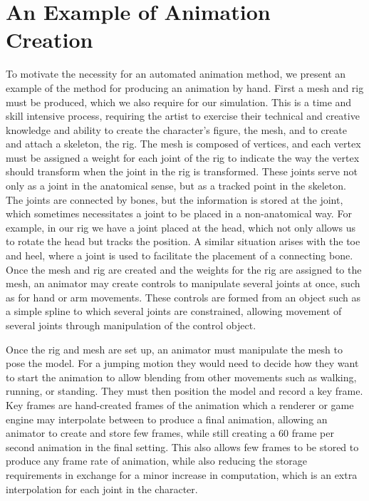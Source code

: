 
 
\section{An Example of Animation Creation}
\label{section:anim_ex}
To motivate the necessity for an automated animation method, we present an example of the method for producing an animation by hand.  First a mesh and rig must be produced, which we also require for our simulation.  This is a time and skill intensive process, requiring the artist to exercise their technical and creative knowledge and ability to create the character's figure, the mesh, and to create and attach a skeleton, the rig.  The mesh is composed of vertices, and each vertex must be assigned a weight for each joint of the rig to indicate the way the vertex should transform when the joint in the rig is transformed.  These joints serve not only as a joint in the anatomical sense, but as a tracked point in the skeleton.  The joints are connected by bones, but the information is stored at the joint, which sometimes necessitates a joint to be placed in a non-anatomical way.  For example, in our rig we have a joint placed at the head, which not only allows us to rotate the head but tracks the position.  A similar situation arises with the toe and heel, where a joint is used to facilitate the placement of a connecting bone.  Once the mesh and rig are created and the weights for the rig are assigned to the mesh, an animator may create controls to manipulate several joints at once, such as for hand or arm movements.  These controls are formed from an object such as a simple spline to which several joints are constrained, allowing movement of several joints through manipulation of the control object.

Once the rig and mesh are set up, an animator must manipulate the mesh to pose the model.  For a jumping motion they would need to decide how they want to start the animation to allow blending from other movements such as walking, running, or standing.  They must then position the model and record a key frame.  Key frames are hand-created frames of the animation which a renderer or game engine may interpolate between to produce a final animation, allowing an animator to create and store few frames, while still creating a 60 frame per second animation in the final setting.  This also allows few frames to be stored to produce any frame rate of animation, while also reducing the storage requirements in exchange for a minor increase in computation, which is an extra interpolation for each joint in the character.

